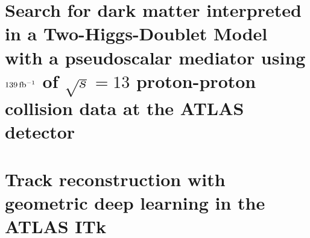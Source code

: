 \documentclass[12pt]{withesis}
\begin{document}

% 
\setcounter{page}{0}
% 
% 
% 

\tableofcontents
\cleardoublepage
{} %
\listoffigures
\cleardoublepage
{} %
\listoftables


\setlength{\parskip}{1em}


\part{Search for dark matter interpreted in a Two-Higgs-Doublet Model with a pseudoscalar mediator using $139\, \mbox{fb\(^{-1}\)}$ of $\sqrt{s}=13$ \TeV proton-proton collision data at the ATLAS detector}





\part{Track reconstruction with geometric deep learning in the ATLAS ITk}



% 



% 
% 

% 
% 


% 
% 
% 
% 

% 
% 

% 
\end{document}
